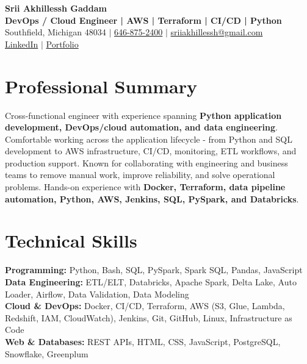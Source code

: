 \documentclass[letterpaper,10pt]{article}
\begin{document}
\fontsize{9.35pt}{10.45pt}\selectfont

\begin{center}
    {\LARGE \textbf{Srii Akhillessh Gaddam}} \\[-1pt]
    \textbf{DevOps / Cloud Engineer | AWS | Terraform | CI/CD | Python} \\[2pt]
    Southfield, Michigan 48034 $|$
    \href{tel:6468752400}{646-875-2400} $|$
    \href{mailto:sriiakhillessh@gmail.com}{sriiakhillessh@gmail.com} \\[1pt]
    \href{https://www.linkedin.com/in/srii-akhiilessh-gaddam-b48668191/}{LinkedIn} $|$
    \href{https://sriiakhillesshg.github.io/portfolio/}{Portfolio}
\end{center}
\vspace{-8pt}

\section{Professional Summary}
\small{Cross-functional engineer with experience spanning \textbf{Python application development, DevOps/cloud automation, and data engineering}. Comfortable working across the application lifecycle - from Python and SQL development to AWS infrastructure, CI/CD, monitoring, ETL workflows, and production support. Known for collaborating with engineering and business teams to remove manual work, improve reliability, and solve operational problems. Hands-on experience with \textbf{Docker, Terraform, data pipeline automation, Python, AWS, Jenkins, SQL, PySpark, and Databricks}.}

\section{Technical Skills}
\small{
\textbf{Programming:} Python, Bash, SQL, PySpark, Spark SQL, Pandas, JavaScript \\
\textbf{Data Engineering:} ETL/ELT, Databricks, Apache Spark, Delta Lake, Auto Loader, Airflow, Data Validation, Data Modeling \\
\textbf{Cloud \& DevOps:} Docker, CI/CD, Terraform, AWS (S3, Glue, Lambda, Redshift, IAM, CloudWatch), Jenkins, Git, GitHub, Linux, Infrastructure as Code \\
\textbf{Web \& Databases:} REST APIs, HTML, CSS, JavaScript, PostgreSQL, Snowflake, Greenplum
}
\end{document}
